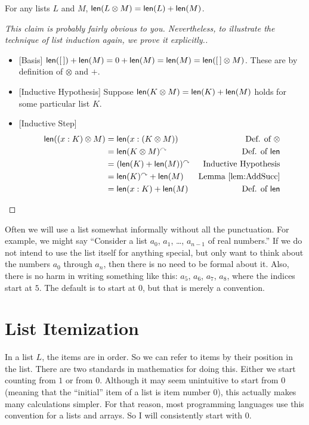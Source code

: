 \begin{lemma}
  For any lists $L$ and $M$, $\mathord{\textsf{len}}(L\otimes M) = \mathord{\textsf{len}}(L)+\mathord{\textsf{len}}(M)$.

\begin{proof} [This claim is probably fairly obvious to
  you. Nevertheless, to illustrate the technique of list
  induction again, we prove it explicitly.]
  \begin{itemize}
  \item {}[Basis] $\mathord{\textsf{len}}([\,]) + \mathord{\textsf{len}}(M) = 0 + \mathord{\textsf{len}}(M) = \mathord{\textsf{len}}(M) =
    \mathord{\textsf{len}}([\,]\otimes M)$. These are by definition of $\otimes$ and $+$.
  \item{} [Inductive Hypothesis] Suppose $\mathord{\textsf{len}}(K\otimes M) = \mathord{\textsf{len}}(K)
    + \mathord{\textsf{len}}(M)$ holds for some particular list $K$.
  \item{} [Inductive Step]
    \begin{align*}
      \mathord{\textsf{len}}((x:K)\otimes M) &= \mathord{\textsf{len}}(x:(K\otimes M)) &\mbox{Def. of $\otimes$}\\
      &= \mathord{\textsf{len}}(K\otimes M)^\curvearrowright &\mbox{Def. of $\mathord{\textsf{len}}$}\\
      &= (\mathord{\textsf{len}}(K)+\mathord{\textsf{len}}(M))^\curvearrowright &\mbox{Inductive Hypothesis}\\
      &= \mathord{\textsf{len}}(K)^\curvearrowright + \mathord{\textsf{len}}(M) &\mbox{Lemma \ref{lem:AddSucc}}\\
      &= \mathord{\textsf{len}}(x:K) + \mathord{\textsf{len}}(M) &\mbox{Def. of $\mathord{\textsf{len}}$}
    \end{align*}
  \end{itemize}
\end{proof}
\end{lemma}

Often we will use a list somewhat informally without all the
punctuation. For example, we might say ``Consider a list $a_0$, $a_1$,
\ldots, $a_{n-1}$ of real numbers.'' If we do not intend to use the list
itself for anything special, but only want to think about the numbers
$a_0$ through $a_n$, then there is no need to be formal about
it. Also, there is no harm in writing something like this: $a_5$,
$a_6$, $a_7$, $a_8$, where the indices start at
$5$. The default is to start at $0$, but that is merely a convention.

\section{List Itemization}

In a list $L$, the items are in order. So we can refer to items by
their position in the list. There are two standards in mathematics
for doing this. Either we start counting from $1$ or from $0$.
Although it may seem unintuitive to start from $0$ (meaning that
the ``initial'' item of a list is item number $0$), this actually 
makes many calculations simpler. For that reason, most programming
languages use this convention for a lists and arrays. So I will consistently
start with $0$.

